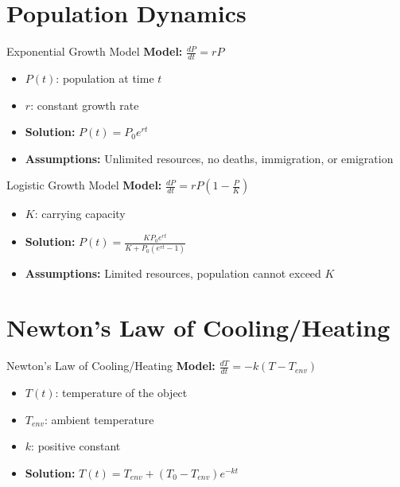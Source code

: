 \documentclass[10pt,aspectratio=169]{beamer}
\begin{document}
\section{Population Dynamics}
\begin{frame}{Exponential Growth Model}
    \textbf{Model:} $\frac{dP}{dt} = rP$
    \begin{itemize}
        \item $P(t)$: population at time $t$
        \item $r$: constant growth rate
        \item \textbf{Solution:} $P(t) = P_0 e^{rt}$
        \item \textbf{Assumptions:} Unlimited resources, no deaths, immigration, or emigration
    \end{itemize}
\end{frame}

\begin{frame}{Logistic Growth Model}
    \textbf{Model:} $\frac{dP}{dt} = rP\left(1-\frac{P}{K}\right)$
    \begin{itemize}
        \item $K$: carrying capacity
        \item \textbf{Solution:} $P(t) = \frac{KP_0 e^{rt}}{K + P_0 (e^{rt} - 1)}$
        \item \textbf{Assumptions:} Limited resources, population cannot exceed $K$
    \end{itemize}
\end{frame}

\section{Newton's Law of Cooling/Heating}
\begin{frame}{Newton's Law of Cooling/Heating}
    \textbf{Model:} $\frac{dT}{dt} = -k(T - T_{env})$
    \begin{itemize}
        \item $T(t)$: temperature of the object
        \item $T_{env}$: ambient temperature
        \item $k$: positive constant
        \item \textbf{Solution:} $T(t) = T_{env} + (T_0 - T_{env})e^{-kt}$
    \end{itemize}
\end{frame}

\end{document}

